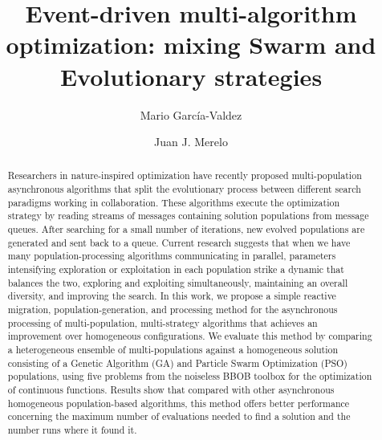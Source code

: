 \documentclass[runningheads]{llncs}
\begin{document}
\title{Event-driven multi-algorithm optimization: mixing Swarm and
  Evolutionary strategies}
\author{Mario Garc\'ia-Valdez \and
Juan J. Merelo }


%
\maketitle              %
%
\begin{abstract}

Researchers in nature-inspired optimization have recently
proposed multi-population asynchronous algorithms that split the 
evolutionary process between different search 
paradigms working in collaboration. These
algorithms execute the optimization strategy by reading streams of
messages containing solution populations from message queues. After
searching for a small number of iterations, new evolved populations
are generated and sent back to a queue. Current research suggests that
when we have many population-processing algorithms communicating in
parallel, parameters intensifying exploration or exploitation in each
population strike a dynamic that balances the two, exploring and
exploiting simultaneously, maintaining an overall diversity, and
improving the search.  In this work, we propose a simple reactive
migration, population-generation, and processing method for
the asynchronous processing of multi-population, multi-strategy
algorithms that achieves an improvement over homogeneous
configurations. We evaluate this method by comparing a heterogeneous
ensemble of multi-populations against a homogeneous solution
consisting of a Genetic Algorithm (GA) and Particle Swarm Optimization
(PSO) populations, using five problems from
the noiseless BBOB toolbox for the optimization of continuous
functions. Results show that compared with other asynchronous
homogeneous population-based algorithms, this method offers better
performance concerning the maximum number of evaluations needed to find a
solution and the number runs where it found it.

\end{abstract}
%
%
%
\end{document}
